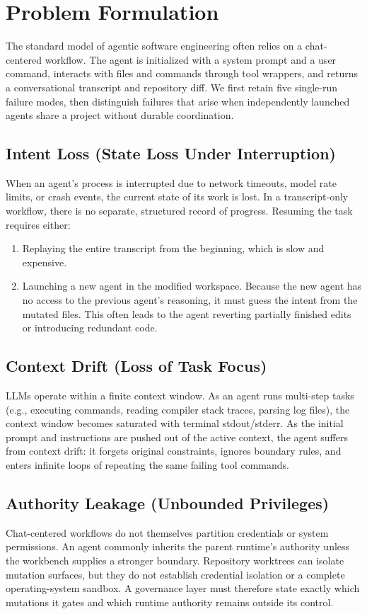 \section{Problem Formulation}
\label{sec:problem}

The standard model of agentic software engineering often relies on a chat-centered workflow. The agent is initialized with a system prompt and a user command, interacts with files and commands through tool wrappers, and returns a conversational transcript and repository diff. We first retain five single-run failure modes, then distinguish failures that arise when independently launched agents share a project without durable coordination.

\subsection{Intent Loss (State Loss Under Interruption)}
When an agent's process is interrupted due to network timeouts, model rate limits, or crash events, the current state of its work is lost. In a transcript-only workflow, there is no separate, structured record of progress. Resuming the task requires either:
\begin{enumerate}
    \item Replaying the entire transcript from the beginning, which is slow and expensive.
    \item Launching a new agent in the modified workspace. Because the new agent has no access to the previous agent's reasoning, it must guess the intent from the mutated files. This often leads to the agent reverting partially finished edits or introducing redundant code.
\end{enumerate}

\subsection{Context Drift (Loss of Task Focus)}
LLMs operate within a finite context window. As an agent runs multi-step tasks (e.g., executing commands, reading compiler stack traces, parsing log files), the context window becomes saturated with terminal stdout/stderr. As the initial prompt and instructions are pushed out of the active context, the agent suffers from context drift: it forgets original constraints, ignores boundary rules, and enters infinite loops of repeating the same failing tool commands.

\subsection{Authority Leakage (Unbounded Privileges)}
Chat-centered workflows do not themselves partition credentials or system permissions. An agent commonly inherits the parent runtime's authority unless the workbench supplies a stronger boundary. Repository worktrees can isolate mutation surfaces, but they do not establish credential isolation or a complete operating-system sandbox. A governance layer must therefore state exactly which mutations it gates and which runtime authority remains outside its control.

